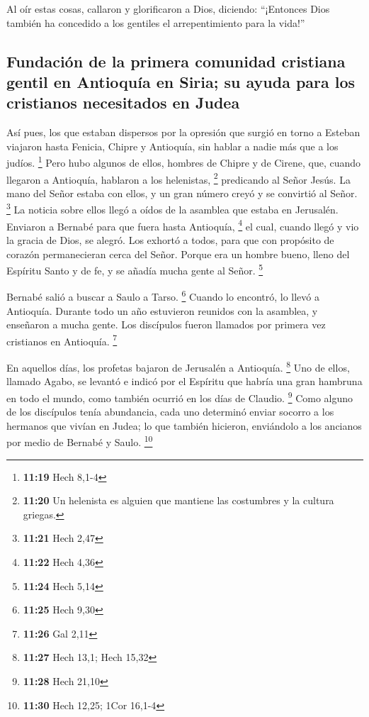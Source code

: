  Al oír estas cosas, callaron y glorificaron a Dios,
diciendo: ``¡Entonces Dios también ha concedido a los gentiles el
arrepentimiento para la vida!''

\hypertarget{fundaciuxf3n-de-la-primera-comunidad-cristiana-gentil-en-antioquuxeda-en-siria-su-ayuda-para-los-cristianos-necesitados-en-judea}{%
\subsection{Fundación de la primera comunidad cristiana gentil en
Antioquía en Siria; su ayuda para los cristianos necesitados en
Judea}\label{fundaciuxf3n-de-la-primera-comunidad-cristiana-gentil-en-antioquuxeda-en-siria-su-ayuda-para-los-cristianos-necesitados-en-judea}}

 Así pues, los que estaban dispersos por la opresión que
surgió en torno a Esteban viajaron hasta Fenicia, Chipre y Antioquía,
sin hablar a nadie más que a los judíos. \footnote{\textbf{11:19} Hech
  8,1-4}  Pero hubo algunos de ellos, hombres de Chipre y
de Cirene, que, cuando llegaron a Antioquía, hablaron a los helenistas,
\footnote{\textbf{11:20} Un helenista es alguien que mantiene las
  costumbres y la cultura griegas.} predicando al Señor Jesús.
 La mano del Señor estaba con ellos, y un gran número
creyó y se convirtió al Señor. \footnote{\textbf{11:21} Hech 2,47}
 La noticia sobre ellos llegó a oídos de la asamblea que
estaba en Jerusalén. Enviaron a Bernabé para que fuera hasta Antioquía,
\footnote{\textbf{11:22} Hech 4,36}  el cual, cuando
llegó y vio la gracia de Dios, se alegró. Los exhortó a todos, para que
con propósito de corazón permanecieran cerca del Señor. 
Porque era un hombre bueno, lleno del Espíritu Santo y de fe, y se
añadía mucha gente al Señor. \footnote{\textbf{11:24} Hech 5,14}

 Bernabé salió a buscar a Saulo a Tarso. \footnote{\textbf{11:25}
  Hech 9,30}  Cuando lo encontró, lo llevó a Antioquía.
Durante todo un año estuvieron reunidos con la asamblea, y enseñaron a
mucha gente. Los discípulos fueron llamados por primera vez cristianos
en Antioquía. \footnote{\textbf{11:26} Gal 2,11}

 En aquellos días, los profetas bajaron de Jerusalén a
Antioquía. \footnote{\textbf{11:27} Hech 13,1; Hech 15,32}
 Uno de ellos, llamado Agabo, se levantó e indicó por el
Espíritu que habría una gran hambruna en todo el mundo, como también
ocurrió en los días de Claudio. \footnote{\textbf{11:28} Hech 21,10}
 Como alguno de los discípulos tenía abundancia, cada uno
determinó enviar socorro a los hermanos que vivían en Judea;
 lo que también hicieron, enviándolo a los ancianos por
medio de Bernabé y Saulo. \footnote{\textbf{11:30} Hech 12,25; 1Cor
  16,1-4}

